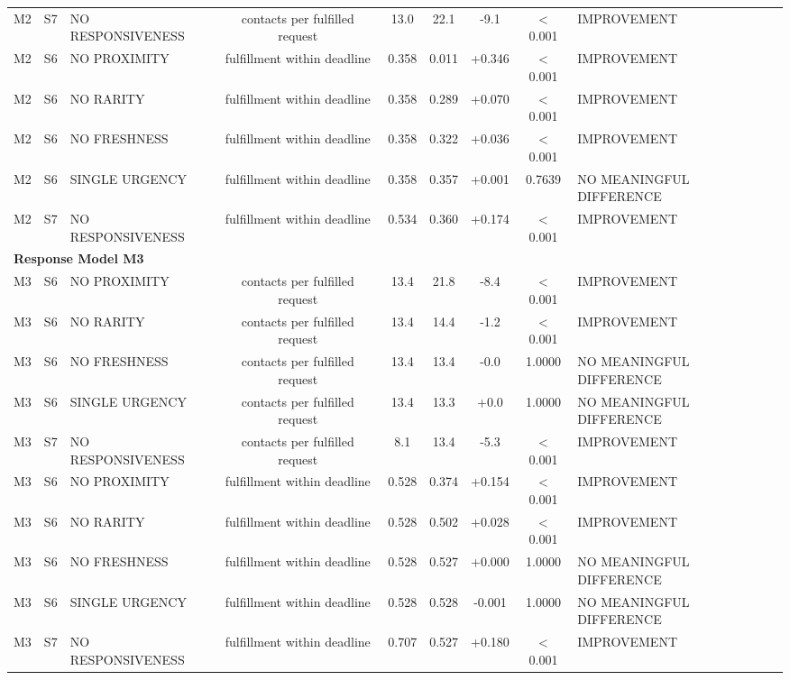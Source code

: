 \begin{table}[t]
\begin{tabular}{lllcccccl}
M2 & S7 & NO RESPONSIVENESS & contacts per fulfilled request & 13.0 & 22.1 & -9.1 & < 0.001 & IMPROVEMENT \\
M2 & S6 & NO PROXIMITY & fulfillment within deadline & 0.358 & 0.011 & +0.346 & < 0.001 & IMPROVEMENT \\
M2 & S6 & NO RARITY & fulfillment within deadline & 0.358 & 0.289 & +0.070 & < 0.001 & IMPROVEMENT \\
M2 & S6 & NO FRESHNESS & fulfillment within deadline & 0.358 & 0.322 & +0.036 & < 0.001 & IMPROVEMENT \\
M2 & S6 & SINGLE URGENCY & fulfillment within deadline & 0.358 & 0.357 & +0.001 & 0.7639 & NO MEANINGFUL DIFFERENCE \\
M2 & S7 & NO RESPONSIVENESS & fulfillment within deadline & 0.534 & 0.360 & +0.174 & < 0.001 & IMPROVEMENT \\
\midrule
\multicolumn{9}{l}{\textbf{Response Model M3}} \\
\midrule
M3 & S6 & NO PROXIMITY & contacts per fulfilled request & 13.4 & 21.8 & -8.4 & < 0.001 & IMPROVEMENT \\
M3 & S6 & NO RARITY & contacts per fulfilled request & 13.4 & 14.4 & -1.2 & < 0.001 & IMPROVEMENT \\
M3 & S6 & NO FRESHNESS & contacts per fulfilled request & 13.4 & 13.4 & -0.0 & 1.0000 & NO MEANINGFUL DIFFERENCE \\
M3 & S6 & SINGLE URGENCY & contacts per fulfilled request & 13.4 & 13.3 & +0.0 & 1.0000 & NO MEANINGFUL DIFFERENCE \\
M3 & S7 & NO RESPONSIVENESS & contacts per fulfilled request & 8.1 & 13.4 & -5.3 & < 0.001 & IMPROVEMENT \\
M3 & S6 & NO PROXIMITY & fulfillment within deadline & 0.528 & 0.374 & +0.154 & < 0.001 & IMPROVEMENT \\
M3 & S6 & NO RARITY & fulfillment within deadline & 0.528 & 0.502 & +0.028 & < 0.001 & IMPROVEMENT \\
M3 & S6 & NO FRESHNESS & fulfillment within deadline & 0.528 & 0.527 & +0.000 & 1.0000 & NO MEANINGFUL DIFFERENCE \\
M3 & S6 & SINGLE URGENCY & fulfillment within deadline & 0.528 & 0.528 & -0.001 & 1.0000 & NO MEANINGFUL DIFFERENCE \\
M3 & S7 & NO RESPONSIVENESS & fulfillment within deadline & 0.707 & 0.527 & +0.180 & < 0.001 & IMPROVEMENT \\
\bottomrule
\end{tabular}
\end{table}
